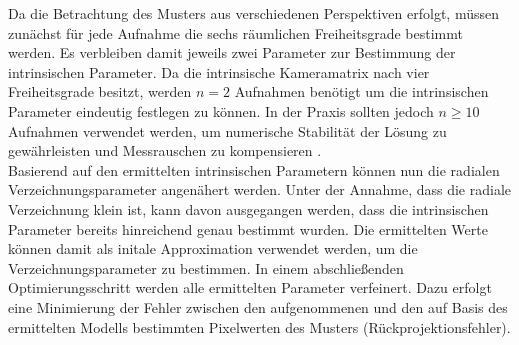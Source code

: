 Da die Betrachtung des Musters aus verschiedenen Perspektiven erfolgt, müssen zunächst für jede Aufnahme die sechs räumlichen Freiheitsgrade bestimmt werden. Es verbleiben damit jeweils zwei Parameter zur Bestimmung der intrinsischen Parameter. Da die intrinsische Kameramatrix nach  vier Freiheitsgrade besitzt, werden $n = 2$ Aufnahmen benötigt um die intrinsischen Parameter eindeutig festlegen zu können. In der Praxis sollten jedoch $n \geq 10$ Aufnahmen verwendet werden, um numerische Stabilität der Lösung zu gewährleisten und Messrauschen zu kompensieren \cite{Bradsky2008}.\\


Basierend auf den ermittelten intrinsischen Parametern können nun die radialen Verzeichnungsparameter angenähert werden. Unter der Annahme, dass die radiale Verzeichnung klein ist, kann davon ausgegangen werden, dass die intrinsischen Parameter bereits hinreichend genau bestimmt wurden. Die ermittelten Werte können damit als initale Approximation verwendet werden, um die Verzeichnungsparameter zu bestimmen. In einem abschließenden Optimierungsschritt werden alle ermittelten Parameter verfeinert. Dazu erfolgt eine Minimierung der Fehler zwischen den aufgenommenen und den auf Basis des ermittelten Modells bestimmten Pixelwerten des Musters (Rückprojektionsfehler).




